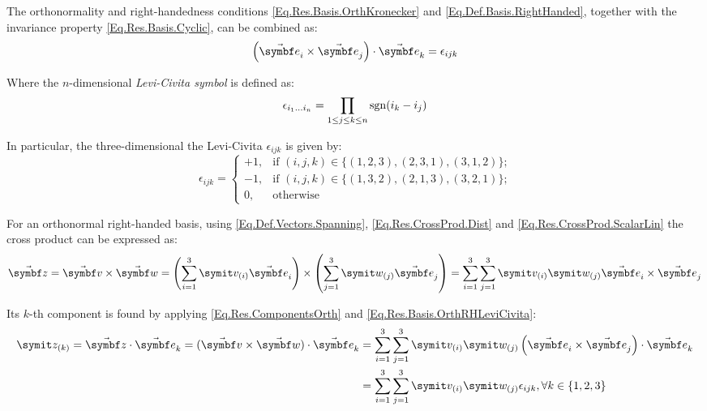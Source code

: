 The orthonormality and right-handedness conditions \eqref{Eq.Res.Basis.OrthKronecker} and \eqref{Eq.Def.Basis.RightHanded}, together with the invariance property \eqref{Eq.Res.Basis.Cyclic}, can be combined as:
\begin{equation} \label{Eq.Res.Basis.OrthRHLeviCivita}
\rndp{\vasub{\bv}{i} \times \vasub{\bv}{j}} \cdot \vasub{\bv}{k} = \epsilon_{ijk}
\end{equation}

Where the $n$-dimensional \emph{Levi-Civita symbol} is defined as:
\begin{equation} \label{Eq.Def.LeviCivitaND}
\epsilon_{i_1 \dots i_n} = \prod_{1 \leq j \leq k \leq n} \operatorname{sgn}(i_k-i_j)
\end{equation}

In particular, the three-dimensional the Levi-Civita $\epsilon_{ijk}$ is given by:
\begin{equation} \label{Eq.Def.LeviCivita3D}
\epsilon_{ijk}=
\begin{cases}
+1, &\text{if $(i,j,k)\in\{(1,2,3), (2,3,1), (3,1,2)\}$;}\\
-1, &\text{if  $(i,j,k)\in\{(1,3,2), (2,1,3), (3,2,1)\}$;}\\
0, &\text{otherwise}
\end{cases}
\end{equation}

For an orthonormal right-handed basis, using \eqref{Eq.Def.Vectors.Spanning}, \eqref{Eq.Res.CrossProd.Dist} and \eqref{Eq.Res.CrossProd.ScalarLin} the cross product can be expressed as:
\begin{equation} \label{Eq.Def.CrossProdComp0}
\vabs{z}=\vabs{v} \times \vabs{w}=\rndp{\sum_{i=1}^{3}\cmp{v}{i}\vasub{\bv}{i}}\times\rndp{\sum_{j=1}^{3}\cmp{w}{j}\vasub{\bv}{j}} =\sum_{i=1}^{3}\sum_{j=1}^{3} \cmp{v}{i} \cmp{w}{j} \vasub{\bv}{i} \times \vasub{\bv}{j}
\end{equation}

Its $k$-th component is found by applying \eqref{Eq.Res.ComponentsOrth} and \eqref{Eq.Res.Basis.OrthRHLeviCivita}:
\begin{equation} \label{Eq.Def.CrossProdComp1}
\begin{split}
\cmp{z}{k}
= \vabs{z} \cdot \vasub{\bv}{k} = (\vabs{v} \times \vabs{w}) \cdot \vasub{\bv}{k}
&=\sum_{i=1}^{3}\sum_{j=1}^{3} \cmp{v}{i} \cmp{w}{j} \rndp{\vasub{\bv}{i} \times \vasub{\bv}{j}} \cdot \vasub{\bv}{k}\\
&=\sum_{i=1}^{3}\sum_{j=1}^{3} \cmp{v}{i} \cmp{w}{j} \epsilon_{ijk}, \forall k\in\{1,2,3\} 
\end{split}
\end{equation}

